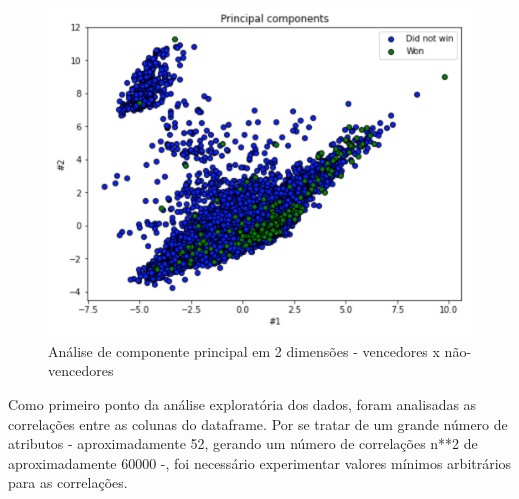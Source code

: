         \begin{figure}[htb]
        	\caption{\label{pca_2}Análise de componente principal em 2 dimensões - vencedores x não-vencedores}
        	\begin{center}
        		\includegraphics[scale=0.7]{pca_2.png}
        	\end{center}
        \end{figure}
        
        

        Como primeiro ponto da análise exploratória dos dados, foram analisadas as correlações entre as colunas do dataframe. Por se tratar de um grande número de atributos - aproximadamente 52, gerando um número de correlações n**2 de aproximadamente 60000 -, foi necessário experimentar valores mínimos arbitrários para as correlações.


